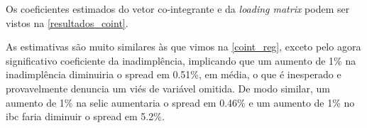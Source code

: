 \documentclass[a4paper,
               article,
               12pt,
               openany,
               oneside,
               english,
               brazil]{abntex2}
\numberwithin{equation}{section}
\begin{document}
    Os coeficientes estimados do vetor co-integrante e da \textit{loading matrix} podem ser vistos na \autoref{resultados_coint}. 
    
    \begin{table}[!hbt]
    \end{table}

    As estimativas são muito similares às que vimos na \autoref{coint_reg}, exceto pelo agora significativo coeficiente da inadimplência, implicando que um aumento de 1\% na inadimplência diminuiria o spread em 0.51\%, em média, o que é inesperado e provavelmente denuncia um viés de variável omitida. De modo similar, um aumento de 1\% na selic aumentaria o spread em 0.46\% e um aumento de 1\% no ibc faria diminuir o spread em 5.2\%.
\end{document}
